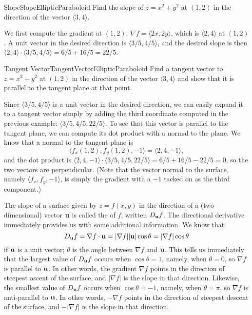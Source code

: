 \begin{example}{Slope}{SlopeEllipticParaboloid}
Find the slope of $z=x^2+y^2$ at $(1,2)$ in the direction of the
vector $\langle 3,4\rangle$.
\end{example}
\begin{solution}
We first compute the gradient at $(1,2)$:
$\nabla f=\langle 2x,2y\rangle$, which is $\langle 2,4\rangle$ at
$(1,2)$. A unit vector in the desired direction is $\langle
3/5,4/5\rangle$, and the desired slope is then
$\langle 2,4\rangle\cdot\langle 3/5,4/5\rangle=6/5+16/5=22/5$.
\end{solution}

\begin{example}{Tangent Vector}{TangentVectorEllipticParaboloid}
Find a tangent vector to $z=x^2+y^2$ at $(1,2)$ in the direction of the
vector $\langle 3,4\rangle$ and show that it is parallel to the
tangent plane at that point.
\end{example}
\begin{solution}
Since $\langle 3/5,4/5\rangle$ is a unit vector in the desired
direction, we can easily expand it to a tangent vector simply by
adding the third coordinate computed in the previous example: $\langle
3/5,4/5,22/5\rangle$.  To see that this vector is parallel to the
tangent plane, we can compute its dot product with a normal to the
plane. We know that a normal to the tangent plane is
$$\langle f_x(1,2),f_y(1,2),-1\rangle = \langle 2,4,-1\rangle,$$
and the dot product is $\langle 2,4,-1\rangle\cdot\langle
3/5,4/5,22/5\rangle=6/5+16/5-22/5=0$, so the two vectors are
perpendicular. (Note that the vector normal to the surface, namely 
$\langle f_x,f_y,-1\rangle$, is simply the gradient with a $-1$ tacked
on as the third component.)
\end{solution}

The slope of a surface given by $z=f(x,y)$ in the direction of a
(two-dimensional) vector $\bf u$ is called the  of $f$, written $D_{\bf u}f$.
The directional derivative immediately provides us with some
additional information. We know that 
$$D_{\bf u}f=\nabla f\cdot {\bf u}=|\nabla f||{\bf u}|\cos\theta=
|\nabla f|\cos\theta$$
if $\bf u$ is a unit vector; $\theta$ is the angle between $\nabla f$
and $\bf u$. This tells us immediately that the largest value of
$D_{\bf u}f$ occurs when $\cos\theta=1$, namely, when $\theta=0$, so 
$\nabla f$ is parallel to $\bf u$. In other words, the gradient
$\nabla f$ points in the direction of steepest ascent of the surface, and 
$|\nabla f|$ is the slope in that direction. Likewise, the smallest value of
$D_{\bf u}f$ occurs when $\cos\theta=-1$, namely, when $\theta=\pi$, so 
$\nabla f$ is anti-parallel to $\bf u$. In other words, 
$-\nabla f$ points in the direction of steepest descent of the surface, and 
$-|\nabla f|$ is the slope in that direction.

